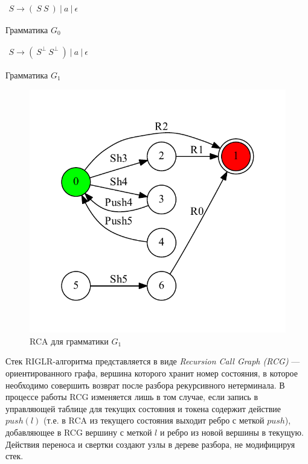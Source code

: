 \documentclass[14pt]{matmex-diploma-custom}
\begin{document}
\begin{listing}[t]
\centering
$\begin{array}{rl}
S \rightarrow ( \ S \ S \ ) \ | \ a \ | \ \epsilon
\end{array}$
\caption{Грамматика $G_0$}
\label{brackets_gr}
\end{listing}

\begin{listing}[t]
\centering
$\begin{array}{rl}
S \rightarrow ( \ S^\perp \ S^\perp \ ) \ | \ a \ | \ \epsilon
\end{array}$
\caption{Грамматика $G_1$}
\label{brackets_gr_mod}
\end{listing}

\begin{figure}[h]
\centering
\includegraphics{pictures/RCABrackets.pdf}
\caption{RCA для грамматики $G_1$}
\label{brackets_rca}
\end{figure} 

Стек RIGLR-алгоритма представляется в виде \textit{Recursion Call Graph (RCG)} --- ориентированного графа, вершина которого хранит номер состояния, в которое необходимо совершить возврат после разбора рекурсивного нетерминала. В процессе работы RCG изменяется лишь в том случае, если запись в управляющей таблице для текущих состояния и токена содержит действие $push(l)$ (т.е. в RCA из текущего состояния выходит ребро с меткой $push$), добавляющее в RCG вершину с меткой $l$ и ребро из новой вершины в текущую. Действия переноса и свертки создают узлы в дереве разбора, не модифицируя стек.
\end{document}
